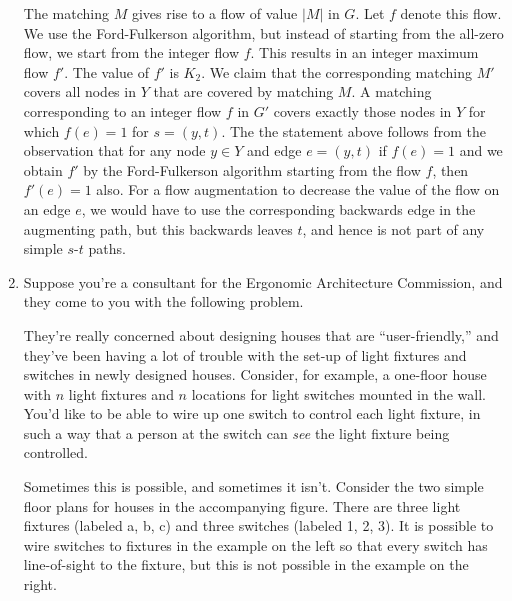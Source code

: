 \documentclass[12pt]{article}
\begin{document}
\begin{enumerate}
{The matching $M$ gives rise to a flow of value $|M|$ in $G$. Let $f$ 
denote this flow. We use the Ford-Fulkerson algorithm,
but instead of starting from the all-zero flow, we 
start from the
integer flow $f$.
This results in an integer maximum flow $f'$. The value 
of $f'$ is $K_2$. We claim that the corresponding matching $M'$ covers
all nodes in $Y$ that are covered by matching $M$. A matching corresponding
to
an integer flow $f$ in $G'$ covers exactly those nodes in $Y$ for which 
$f(e)=1$ for $s=(y,t)$. The the statement above follows from the observation
that for any node $y \in Y$ and edge $e=(y,t)$ if $f(e)=1$ and we obtain 
$f'$ by the Ford-Fulkerson algorithm starting from the flow $f$, then 
$f'(e)=1$ also. For a flow augmentation to decrease the value of the flow
on an edge $e$, we would have to use the corresponding backwards edge in the
augmenting path, but this backwards leaves $t$, and hence is not part of 
any simple $s$-$t$ paths.
}


\item 

Suppose you're a consultant for the
Ergonomic Architecture Commission, and they come
to you with the following problem.

They're really concerned about designing houses
that are ``user-friendly,'' and they've been
having a lot of trouble with the set-up of
light fixtures and switches in newly designed houses.
Consider, for example, a one-floor house with $n$ light fixtures
and $n$ locations for light switches mounted in the wall.
You'd like to be able to wire up one switch to control
each light fixture, in such a way that a person at the
switch can {\em see} the light fixture being controlled.

Sometimes this is possible, and sometimes it isn't.
Consider the two simple floor plans for houses in
the accompanying figure.
There are three light fixtures (labeled a, b, c)
and three switches (labeled 1, 2, 3).
It is possible to wire switches to fixtures in the
example on the left so that every switch has line-of-sight
to the fixture, but this is not possible in the example on
the right.
\begin{figure}[h]
\begin{center}


\end{center}
\end{figure}
\end{enumerate}
\end{document}
